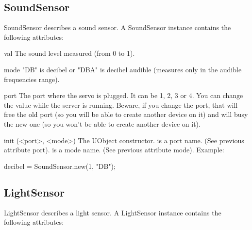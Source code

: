 \subsection{SoundSensor}
SoundSensor describes a sound sensor. A SoundSensor instance contains the
following attributes:

\begin{urbiscriptapi}

\item[val] The sound level measured (from 0 to 1).

\item[mode] "DB" is decibel or "DBA" is decibel audible (measures only in
  the audible frequencies range).

\item[port] The port where the servo is plugged. It can be 1, 2, 3 or 4. You
  can change the value while the server is running. Beware, if you change
  the port, that will free the old port (so you will be able to create
  another device on it) and will busy the new one (so you won't be able to
  create another device on it).


\item[init](<port>, <mode>) The UObject constructor.  is a port
  name. (See previous attribute port).  is a mode name. (See
  previous attribute mode). Example:
\begin{urbiunchecked}
  decibel = SoundSensor.new(1, "DB");
\end{urbiunchecked}

\end{urbiscriptapi}

\subsection{LightSensor}
LightSensor describes a light sensor. A LightSensor instance contains the
following attributes:

